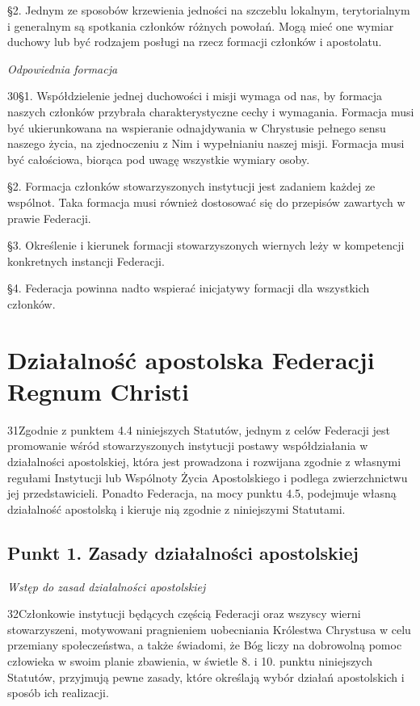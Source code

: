 ﻿\documentclass{book}
\newcommand{\lett}[1]{\lettrine[findent=6pt]{#1}}
\newcommand{\ssec}[1]{\vspace{1em}\textit{#1}\vspace{.5em}\nopagebreak}
\begin{document}
\S{}2. Jednym ze sposobów krzewienia jedności na szczeblu lokalnym, terytorialnym i generalnym są spotkania członków różnych powołań. Mogą mieć one wymiar duchowy lub być rodzajem posługi na rzecz formacji członków i apostolatu.
 
\ssec{Odpowiednia formacja}
 
\lett{30} \S{}1. Współdzielenie jednej duchowości i misji wymaga od nas, by formacja naszych członków przybrała charakterystyczne cechy i wymagania. Formacja musi być ukierunkowana na wspieranie odnajdywania w Chrystusie pełnego sensu naszego życia, na zjednoczeniu z Nim i wypełnianiu naszej misji. Formacja musi być całościowa,  biorąca pod uwagę wszystkie wymiary osoby.


\S{}2. Formacja członków stowarzyszonych instytucji jest zadaniem każdej ze wspólnot. Taka formacja musi również dostosować się do przepisów zawartych w prawie Federacji.


\S{}3. Określenie i kierunek formacji stowarzyszonych wiernych leży w kompetencji konkretnych instancji Federacji.


\S{}4. Federacja powinna nadto wspierać inicjatywy formacji dla wszystkich członków.


\chapter{Działalność apostolska Federacji Regnum Christi}


\lett{31} Zgodnie z punktem 4.4 niniejszych Statutów, jednym z celów Federacji jest promowanie wśród stowarzyszonych instytucji postawy współdziałania w działalności apostolskiej, która jest prowadzona i rozwijana zgodnie z własnymi regułami Instytucji lub Wspólnoty Życia Apostolskiego i podlega zwierzchnictwu jej przedstawicieli. Ponadto Federacja, na mocy punktu 4.5, podejmuje  własną działalność  apostolską i kieruje nią zgodnie z niniejszymi Statutami.


\section{Punkt 1. Zasady działalności apostolskiej}


\ssec{Wstęp do zasad działalności apostolskiej}
                        
\lett{32} Członkowie instytucji będących częścią Federacji oraz wszyscy wierni stowarzyszeni, motywowani pragnieniem uobecniania Królestwa Chrystusa w celu przemiany społeczeństwa, a także świadomi, że Bóg liczy na dobrowolną pomoc człowieka w swoim planie zbawienia, w świetle 8. i 10. punktu niniejszych Statutów, przyjmują pewne zasady, które określają wybór działań apostolskich i sposób ich realizacji.
\end{document}
